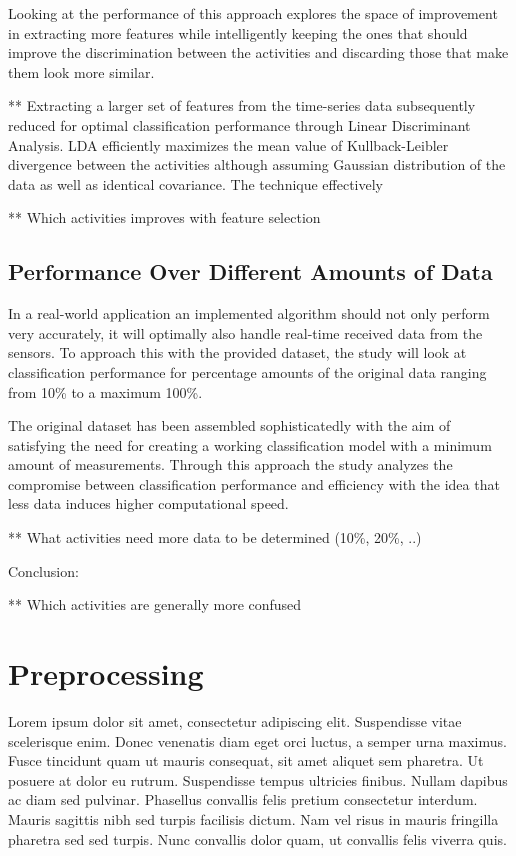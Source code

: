 \documentclass{sig-alternate}
\begin{document}
Looking at the performance of this approach explores the space of improvement in extracting more features while intelligently keeping the ones that should improve the discrimination between the activities and discarding those that make them look more similar.

** Extracting a larger set of features from the time-series data subsequently reduced for optimal classification performance through Linear Discriminant Analysis. LDA efficiently maximizes the mean value of Kullback-Leibler divergence between the activities although assuming Gaussian distribution of the data as well as identical covariance. The technique effectively

** Which activities improves with feature selection

\subsection{Performance Over Different Amounts of Data}
In a real-world application an implemented algorithm should not only perform very accurately, it will optimally also handle real-time received data from the sensors. To approach this with the provided dataset, the study will look at classification performance for percentage amounts of the original data ranging from 10\% to a maximum 100\%.

The original dataset has been assembled sophisticatedly with the aim of satisfying the need for creating a working classification model with a minimum amount of measurements. Through this approach the study analyzes the compromise between classification performance and efficiency with the idea that less data induces higher computational speed.

** What activities need more data to be determined (10\%, 20\%, ..)


Conclusion:

** Which activities are generally more confused


\section{Preprocessing}
Lorem ipsum dolor sit amet, consectetur adipiscing elit. Suspendisse vitae scelerisque enim. Donec venenatis diam eget orci luctus, a semper urna maximus. Fusce tincidunt quam ut mauris consequat, sit amet aliquet sem pharetra. Ut posuere at dolor eu rutrum. Suspendisse tempus ultricies finibus. Nullam dapibus ac diam sed pulvinar. Phasellus convallis felis pretium consectetur interdum. Mauris sagittis nibh sed turpis facilisis dictum. Nam vel risus in mauris fringilla pharetra sed sed turpis. Nunc convallis dolor quam, ut convallis felis viverra quis.
\end{document}
